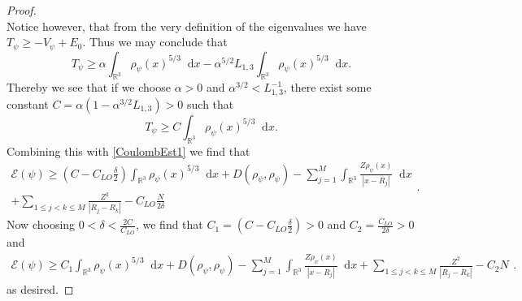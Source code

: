 \documentclass[a4paper,11pt]{article}
\newcommand{\abs}[1]{\left\lvert #1 \right\rvert}
\newcommand*\diff{\mathop{}\!\mathrm{d}}
\newcommand{\R}{\mathbb{R}}
\numberwithin{equation}{section}
\begin{document}
\begin{proof}
\begin{equation}
	\end{equation}
	Notice however, that from the very definition of the eigenvalues we have $ T_\psi\geq -V_\psi+E_0 $. Thus we may conclude that \begin{equation}
	T_\psi\geq\alpha\int_{\R^3}\rho_\psi(x)^{5/3}\diff x-\alpha^{5/2}L_{1,3}\int_{\R^3}\rho_\psi(x)^{5/3}\diff x.
	\end{equation}
	Thereby we see that if we choose $ \alpha>0 $ and $ \alpha^{3/2}<L_{1,3}^{-1} $, there exist some constant $C=\alpha(1-\alpha^{3/2}L_{1,3})>0  $ such that \begin{equation}
	T_\psi\geq C\int_{\R^3}\rho_\psi(x)^{5/3}\diff x.
	\end{equation}
	Combining this with \eqref{CoulombEst1} we find that \begin{equation}
	\begin{aligned}
	\mathcal{E}(\psi)\geq \left(C-C_{LO}\frac{\delta}{2}\right)\int_{\R^3}\rho_\psi(x)^{5/3}\diff x+D(\rho_\psi,\rho_\psi)-\sum_{j=1}^{M}\int_{\R^3}\frac{Z\rho_\psi(x)}{\abs{x-R_j}}\diff x\\+\sum_{1\leq j< k\leq M}\frac{Z^2}{\abs{R_j-R_k}}-C_{LO}\frac{N}{2\delta}
	\end{aligned}.
	\end{equation}
	Now choosing $ 0<\delta<\frac{2C}{C_{LO}} $, we find that $ C_1=\left(C-C_{LO}\frac{\delta}{2}\right)>0 $ and $ C_2=\frac{C_{LO}}{2\delta}>0 $ and 
	\begin{equation}
	\begin{aligned}
	\mathcal{E}(\psi)\geq C_1\int_{\R^3}\rho_\psi(x)^{5/3}\diff x+D(\rho_\psi,\rho_\psi)-\sum_{j=1}^{M}\int_{\R^3}\frac{Z\rho_\psi(x)}{\abs{x-R_j}}\diff x+\sum_{1\leq j< k\leq M}\frac{Z^2}{\abs{R_j-R_k}}-C_2N
	\end{aligned}.
	\end{equation}
	as desired.
\end{proof}
\end{document}

